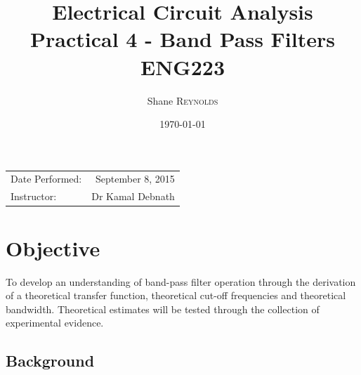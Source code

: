 \documentclass{article}
\title{Electrical Circuit Analysis \\ Practical 4 - Band Pass Filters \\ ENG223} %
\author{Shane \textsc{Reynolds}} %
\date{\today} %
\begin{document}
\maketitle %

\begin{center}
\begin{tabular}{l r}
Date Performed: & September 8, 2015 \\ %
Instructor: & Dr Kamal Debnath %
\end{tabular}
\end{center}



\section{Objective}

To develop an understanding of band-pass filter operation through the derivation of a theoretical transfer function, theoretical cut-off frequencies and theoretical bandwidth. Theoretical estimates will be tested through the collection of experimental evidence.

\subsection{Background}
\label{definitions}
\end{document}
